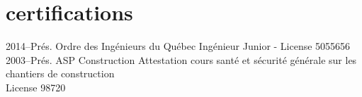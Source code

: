 \documentclass[]{friggeri-cv} %
\begin{document}
\section{certifications}
  \begin{entrylist}
    \entryFULL
      {2014--Prés.}
      {Ordre des Ingénieurs du Québec}
      {}
      {Ingénieur Junior - License 5055656}
      {}
    \entryFULL
      {2003--Prés.}
      {ASP Construction}
      {}
      {Attestation cours santé et sécurité générale sur les chantiers de construction\\License 98720}
      {}
\end{entrylist}

%
%
\end{document}
